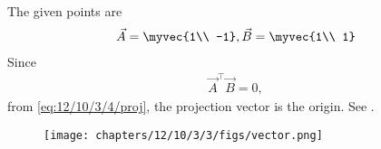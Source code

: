 The given points are
\begin{align}
 \vec{A}=\myvec{1\\ -1},
 \vec{B}=\myvec{1\\ 1}
\end{align}
Since
\begin{align}
	\vec{A}^\top \vec{B} =0,
\end{align}
	from \eqref{eq:12/10/3/4/proj},
the projection vector is the origin.
		See .
\begin{figure}[H]
	\centering
\texttt{[image: chapters/12/10/3/3/figs/vector.png]}
\caption{}
		\label{fig:12/10/3/3fig}
\end{figure}
